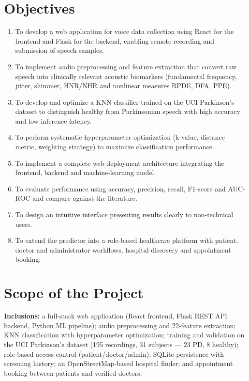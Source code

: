 \documentclass[oneside,a4paper,12pt]{report}
\begin{document}
\section{Objectives}
\begin{enumerate}[label=\arabic*.]
\item To develop a web application for voice data collection using React for the
frontend and Flask for the backend, enabling remote recording and submission of
speech samples.
\item To implement audio preprocessing and feature extraction that convert raw
speech into clinically relevant acoustic biomarkers (fundamental frequency,
jitter, shimmer, HNR/NHR and nonlinear measures RPDE, DFA, PPE).
\item To develop and optimize a KNN classifier trained on the UCI Parkinson's
dataset to distinguish healthy from Parkinsonian speech with high accuracy and
low inference latency.
\item To perform systematic hyperparameter optimization (k-value, distance
metric, weighting strategy) to maximize classification performance.
\item To implement a complete web deployment architecture integrating the
frontend, backend and machine-learning model.
\item To evaluate performance using accuracy, precision, recall, F1-score and
AUC-ROC and compare against the literature.
\item To design an intuitive interface presenting results clearly to
non-technical users.
\item To extend the predictor into a role-based healthcare platform with patient,
doctor and administrator workflows, hospital discovery and appointment booking.
\end{enumerate}

\section{Scope of the Project}
\textbf{Inclusions:} a full-stack web application (React frontend, Flask REST API
backend, Python ML pipeline); audio preprocessing and 22-feature extraction; KNN
classification with hyperparameter optimization; training and validation on the
UCI Parkinson's dataset (195 recordings, 31 subjects --- 23 PD, 8 healthy);
role-based access control (patient/doctor/admin); SQLite persistence with
screening history; an OpenStreetMap-based hospital finder; and appointment
booking between patients and verified doctors.
\end{document}
